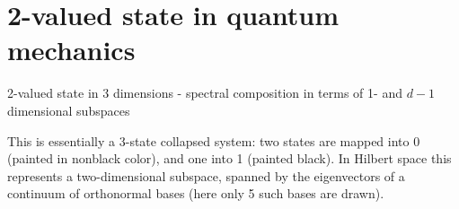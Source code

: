 \documentclass{beamer}
\begin{document}
\section{2-valued state in quantum mechanics}
\begin{frame}{2-valued state in 3 dimensions - spectral composition in terms of 1- and $d-1$ dimensional subspaces}
    \begin{center}
    \end{center}
This is essentially a 3-state collapsed system: two states are mapped into 0 (painted in nonblack color), and one into 1 (painted black). In Hilbert space this represents a two-dimensional subspace, spanned by the eigenvectors of a continuum of orthonormal bases (here only 5 such bases are drawn).
\end{frame}
\end{document}
